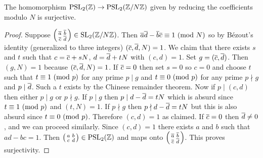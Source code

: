    \begin{proposition}\label{prop:surjective_modulo_N_for_modular_group}
      The homomorphism $\mathrm{PSL}_{2}(\mathbb{Z}) \to \mathrm{PSL}_{2}(\mathbb{Z}/N\mathbb{Z})$ given by reducing the coefficients modulo $N$ is surjective.
    \end{proposition}
    \begin{proof}
      Suppose $\begin{psmallmatrix} \overline{a} & \overline{b} \\ \overline{c} & \overline{d} \end{psmallmatrix} \in \mathrm{SL}_{2}(\mathbb{Z}/N\mathbb{Z})$. Then $\overline{a}\overline{d}-\overline{b}\overline{c} \equiv 1 \ (\mathrm{mod}\text{ }N)$ so by B\'ezout's identity (generalized to three integers) $(\overline{c},\overline{d},N) = 1$. We claim that there exists $s$ and $t$ such that $c = \overline{c}+sN$, $d = \overline{d}+tN$ with $(c,d) = 1$. Set $g = (\overline{c},\overline{d})$. Then $(g,N) = 1$ because $(\overline{c},\overline{d},N) = 1$. If $\overline{c} = 0$ then set $s = 0$ so $c = 0$ and choose $t$ such that $t \equiv 1 \ (\mathrm{mod}\text{ }p)$ for any prime $p \mid g$ and $t \equiv 0 \ (\mathrm{mod}\text{ }p)$ for any prime $p \nmid g$ and $p \mid \overline{d}$. Such a $t$ exists by the Chinese remainder theorem. Now if $p \mid (c,d)$ then either $p \mid g$ or $p \nmid g$. If $p \mid g$ then $p \mid d-\overline{d} = tN$ which is absurd since $t \equiv 1 \ (\mathrm{mod}\text{ }p)$ and $(t,N) = 1$. If $p \nmid g$ then $p \nmid d-\overline{d} = tN$ but this is also absurd since $t \equiv 0 \ (\mathrm{mod}\text{ }p)$. Therefore $(c,d) = 1$ as claimed. If $\overline{c} = 0$ then $\overline{d} \neq 0$, and we can proceed similarly. Since $(c,d) = 1$ there exists $a$ and $b$ such that $ad-bc = 1$. Then $\begin{psmallmatrix} a & b \\ c & d \end{psmallmatrix} \in \mathrm{PSL}_{2}(\mathbb{Z})$ and maps onto $\begin{psmallmatrix} \overline{a} & \overline{b} \\ \overline{c} & \overline{d} \end{psmallmatrix}$. This proves surjectivity.
    \end{proof}
    
